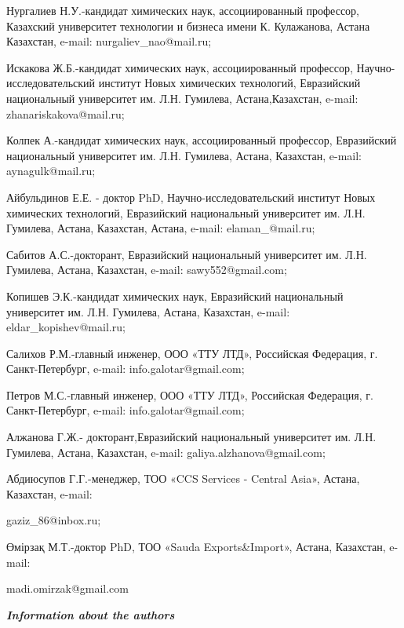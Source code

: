 \begin{noparindent}
Нургалиев Н.У.-кандидат химических наук, ассоциированный профессор,
Казахский университет технологии и бизнеса имени К. Кулажанова, Астана
Казахстан, e-mail: nurgaliev\_nao@mail.ru;

Искакова Ж.Б.-кандидат химических наук, ассоциированный профессор,
Научно-исследовательский институт Новых химических технологий,
Евразийский национальный университет им. Л.Н. Гумилева,
Астана,Казахстан, e-mail: zhanariskakova@mail.ru;

Колпек А.-кандидат химических наук, ассоциированный профессор,
Евразийский национальный университет им. Л.Н. Гумилева, Астана,
Казахстан, e-mail: aynagulk@mail.ru;

Айбульдинов Е.Е. - доктор PhD, Научно-исследовательский институт Новых
химических технологий, Евразийский национальный университет им. Л.Н.
Гумилева, Астана, Казахстан, Астана, e-mail: elaman\_@mail.ru;

Сабитов А.С.-докторант, Евразийский национальный университет им. Л.Н.
Гумилева, Астана, Казахстан, e-mail: sawy552@gmail.com;

Копишев Э.К.-кандидат химических наук, Евразийский национальный
университет им. Л.Н. Гумилева, Астана, Казахстан, e-mail:
eldar\_kopishev@mail.ru;

Салихов Р.М.-главный инженер, ООО «ТТУ ЛТД», Российская Федерация, г.
Санкт-Петербург, e-mail: info.galotar@gmail.com;

Петров М.С.-главный инженер, ООО «ТТУ ЛТД», Российская Федерация, г.
Санкт-Петербург, e-mail: info.galotar@gmail.com;

Алжанова Г.Ж.- докторант,Евразийский национальный университет им. Л.Н.
Гумилева, Астана, Казахстан, e-mail: galiya.alzhanova@gmail.com;

Абдиюсупов Г.Г.-менеджер, ТОО «CCS Services - Central Asia», Астана,
Казахстан, e-mail:

gaziz\_86@inbox.ru;

Өмірзақ М.Т.-доктор PhD, ТОО «Sauda Exports\&Import»,
Астана, Казахстан, e-mail:

madi.omirzak@gmail.com
\end{noparindent}

\emph{{\bfseries Information about the authors}}

